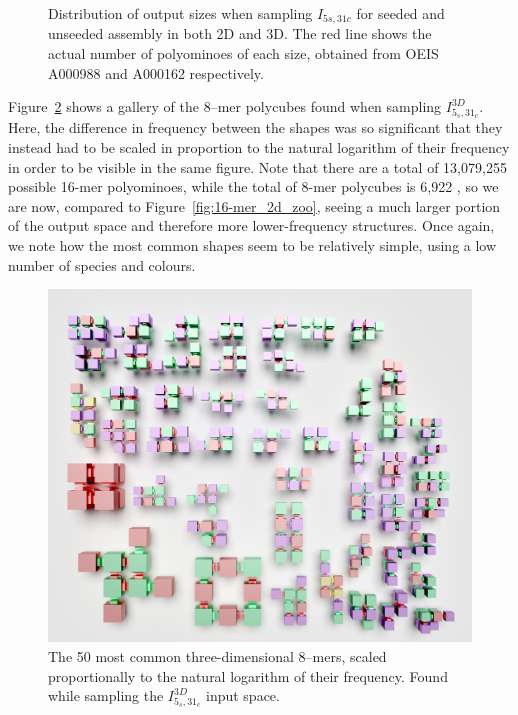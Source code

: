 \begin{figure}[h]
    \centering
    \caption{Distribution of output sizes when sampling \(I_{5s,31c}\) for seeded and unseeded assembly in both 2D and 3D. The red line shows the actual number of polyominoes of each size, obtained from OEIS A000988 and A000162 \cite{sloane1995encyclopedia, oeisA000988} respectively.}
    \label{fig:main_distr}
\end{figure}

Figure~\ref{fig:8-mer_3d_zoo} shows a gallery of the 8--mer polycubes found when sampling \(I_{5_s,31_c}^{3D}\). Here, the difference in frequency between the shapes was so significant that they instead had to be scaled in proportion to the natural logarithm of their frequency in order to be visible in the same figure. Note that there are a total of 13,079,255 possible 16-mer polyominoes, while the total of 8-mer polycubes is 6,922 \cite{sloane1995encyclopedia, oeisA000988}, so we are now, compared to Figure~\ref{fig:16-mer_2d_zoo}, seeing a much larger portion of the output space and therefore more lower-frequency structures. Once again, we note how the most common shapes seem to be relatively simple, using a low number of species and colours.

\begin{figure}[h]
    \centering
    \includegraphics[width=\textwidth]{figures/8-mers_3d.jpg}
    \caption{The 50 most common three-dimensional 8--mers, scaled proportionally to the natural logarithm of their frequency. Found while sampling the \(I_{5_s,31_c}^{3D}\) input space.}
    \label{fig:8-mer_3d_zoo}
\end{figure}

